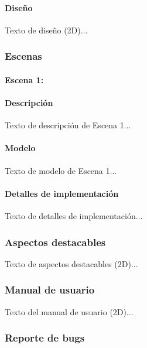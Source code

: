 \documentclass[12pt,a4paper,twoside,spanish]{article}      %
\begin{document}
\paragraph{Diseño}
Texto de diseño (2D)...

\subsubsection{Escenas}
\paragraph{Escena 1: }
\paragraph{Descripción}
Texto de descripción de Escena 1...

\paragraph{Modelo}
Texto de modelo de Escena 1...

\paragraph{Detalles de implementación}
Texto de detalles de implementación...





\subsubsection{Aspectos destacables}
Texto de aspectos destacables (2D)...

\subsubsection{Manual de usuario}
Texto del manual de usuario (2D)...

\subsubsection{Reporte de bugs}
\end{document}
